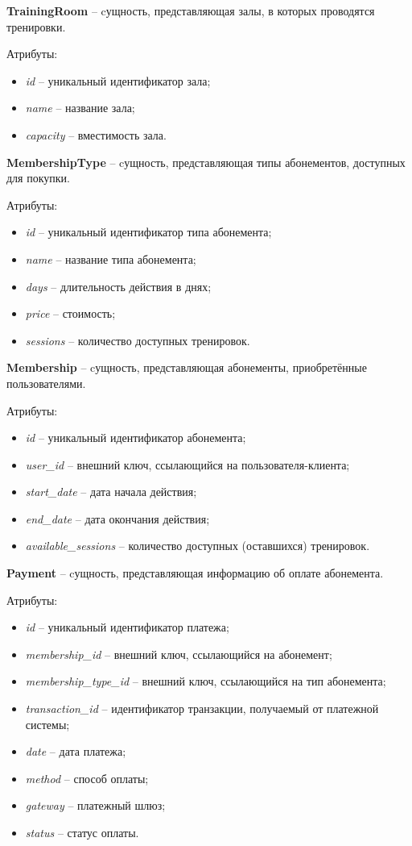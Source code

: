 \textbf{TrainingRoom} -- cущность, представляющая залы, в которых проводятся тренировки.

Атрибуты:
\begin{itemize} 
	\item \textit{id} -- уникальный идентификатор зала;
	\item \textit{name} -- название зала; 
	\item \textit{capacity} -- вместимость зала.
\end{itemize}

\textbf{MembershipType} -- cущность, представляющая типы абонементов, доступных для покупки.

Атрибуты:
\begin{itemize} 
	\item \textit{id} -- уникальный идентификатор типа абонемента;
	\item \textit{name} -- название типа абонемента; 
	\item \textit{days} -- длительность действия в днях;
	\item \textit{price} -- стоимость;
	\item \textit{sessions} -- количество доступных тренировок.
\end{itemize}

\textbf{Membership} -- cущность, представляющая абонементы, приобретённые пользователями.

Атрибуты:
\begin{itemize} 
	\item \textit{id} -- уникальный идентификатор абонемента; 
	\item \textit{user\_id} -- внешний ключ, ссылающийся на пользователя-клиента;
	\item \textit{start\_date} -- дата начала действия;
	\item \textit{end\_date} -- дата окончания действия;
	\item \textit{available\_sessions} -- количество доступных (оставшихся) тренировок.
\end{itemize}

\textbf{Payment} -- cущность, представляющая информацию об оплате абонемента.

Атрибуты:
\begin{itemize} 
	\item \textit{id} -- уникальный идентификатор платежа; 
	\item \textit{membership\_id} -- внешний ключ, ссылающийся на абонемент;
	\item \textit{membership\_type\_id} -- внешний ключ, ссылающийся на тип абонемента;
	\item \textit{transaction\_id} -- идентификатор транзакции, получаемый от платежной системы;
	\item \textit{date} -- дата платежа;
	\item \textit{method} -- способ оплаты;
	\item \textit{gateway} -- платежный шлюз;
	\item \textit{status} -- статус оплаты.
\end{itemize}

